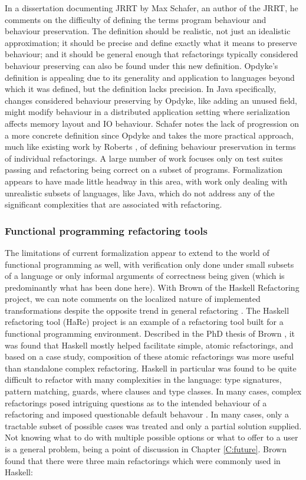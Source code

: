 In a dissertation documenting JRRT by Max Schafer, an author of the JRRT, he comments on the difficulty of defining the terms program behaviour and behaviour preservation. The definition should be realistic, not just an idealistic approximation; it should be precise and define exactly what it means to preserve behaviour; and it should be general enough that refactorings typically considered behaviour preserving can also be found under this new definition. Opdyke's definition is appealing due to its generality and application to languages beyond which it was defined, but the definition lacks precision. In Java specifically, changes considered behaviour preserving by Opdyke, like adding an unused field, might modify behaviour in a distributed application setting where serialization affects memory layout and IO behaviour. Schafer notes the lack of progression on a more concrete definition since Opdyke and takes the more practical approach, much like existing work by Roberts \cite[p. 111]{schafer2010specification}, of defining behaviour preservation in terms of individual refactorings. A large number of work focuses only on test suites passing and refactoring being correct on a subset of programs. Formalization appears to have made little headway in this area, with work only dealing with unrealistic subsets of languages, like Java, which do not address any of the significant complexities that are associated with refactoring.


\subsubsection{Functional programming refactoring tools}
The limitations of current formalization appear to extend to the world of functional programming as well, with verification only done under small subsets of a language or only informal arguments of correctness being given (which is predominantly what has been done here). With Brown of the Haskell Refactoring project, we can note comments on the localized nature of implemented transformations despite the opposite trend in general refactoring \cite{brown2008tool}. The Haskell refactoring tool (HaRe) project is an example of a refactoring tool built for a functional programming environment. Described in the PhD thesis of Brown \cite{brown2008tool}, it was found that Haskell mostly helped facilitate simple, atomic refactorings, and based on a case study, composition of these atomic refactorings was more useful than standalone complex refactoring. Haskell in particular was found to be quite difficult to refactor with many complexities in the language: type signatures, pattern matching, guards, where clauses and type classes. In many cases, complex refactorings posed intriguing questions as to the intended behaviour of a refactoring and imposed questionable default behavour \cite{sculthorpe}. In many cases, only a tractable subset of possible cases was treated and only a partial solution supplied. Not knowing what to do with multiple possible options or what to offer to a user is a general problem, being a point of discussion in Chapter \ref{C:future}. Brown found that there were three main refactorings which were commonly used in Haskell: 


